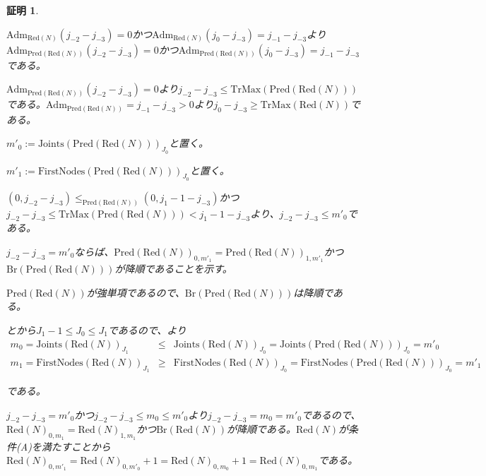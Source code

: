 \documentclass[dvipdfmx,uplatex]{jsarticle}
\theoremstyle{customnonumberbreakfortheorem}
\theoremstyle{customnonumberbreakforproof}
\newtheorem{hideableproof}{証明}
\begin{document}
\begin{hideableproof}
\begin{indented}
\begin{indented}
			\item \(\textrm{Adm}_{\textrm{Red}(N)}(j_{-2}-j_{-3}) = 0\)かつ\(\textrm{Adm}_{\textrm{Red}(N)}(j_0-j_{-3}) = j_{-1}-j_{-3}\)より\(\textrm{Adm}_{\textrm{Pred}(\textrm{Red}(N))}(j_{-2}-j_{-3}) = 0\)かつ\(\textrm{Adm}_{\textrm{Pred}(\textrm{Red}(N))}(j_0-j_{-3}) = j_{-1}-j_{-3}\)である。
			\item \(\textrm{Adm}_{\textrm{Pred}(\textrm{Red}(N))}(j_{-2}-j_{-3}) = 0\)より\(j_{-2}-j_{-3} \leq \textrm{TrMax}(\textrm{Pred}(\textrm{Red}(N)))\)である。\(\textrm{Adm}_{\textrm{Pred}(\textrm{Red}(N))} = j_{-1}-j_{-3} > 0\)より\(j_0-j_{-3} \geq \textrm{TrMax}(\textrm{Red}(N))\)である。
			\item \(m'_0 := \textrm{Joints}(\textrm{Pred}(\textrm{Red}(N)))_{J_0}\)と置く。
			\item \(m'_1 := \textrm{FirstNodes}(\textrm{Pred}(\textrm{Red}(N)))_{J_0}\)と置く。
			\item \((0,j_{-2}-j_{-3}) \leq_{\textrm{Pred}(\textrm{Red}(N))} (0,j_1-1-j_{-3})\)かつ\(j_{-2}-j_{-3} \leq \textrm{TrMax}(\textrm{Pred}(\textrm{Red}(N))) < j_1-1-j_{-3}\)より、\(j_{-2}-j_{-3} \leq m'_0\)である。
			\item
			\item \(j_{-2}-j_{-3} = m'_0\)ならば、\(\textrm{Pred}(\textrm{Red}(N))_{0,m'_1} = \textrm{Pred}(\textrm{Red}(N))_{1,m'_1}\)かつ\(\textrm{Br}(\textrm{Pred}(\textrm{Red}(N)))\)が降順であることを示す。
			\begin{indented}
				\item \(\textrm{Pred}(\textrm{Red}(N))\)が強単項であるので、\(\textrm{Br}(\textrm{Pred}(\textrm{Red}(N)))\)は降順である。
				\item {}とから\(J_1-1 \leq J_0 \leq J_1\)であるので、より
				\begin{eqnarray*}
				m_0 = \textrm{Joints}(\textrm{Red}(N))_{J_1} & \leq & \textrm{Joints}(\textrm{Red}(N))_{J_0} = \textrm{Joints}(\textrm{Pred}(\textrm{Red}(N)))_{J_0} =m'_0 \\
				m_1 = \textrm{FirstNodes}(\textrm{Red}(N))_{J_1} & \geq & \textrm{FirstNodes}(\textrm{Red}(N))_{J_0} = \textrm{FirstNodes}(\textrm{Pred}(\textrm{Red}(N)))_{J_0} =m'_1
				\end{eqnarray*}
				\item である。
				\item \(j_{-2}-j_{-3} = m'_0\)かつ\(j_{-2}-j_{-3} \leq m_0 \leq m'_0\)より\(j_{-2}-j_{-3} = m_0 = m'_0\)であるので、\(\textrm{Red}(N)_{0,m_1} = \textrm{Red}(N)_{1,m_1}\)かつ\(\textrm{Br}(\textrm{Red}(N))\)が降順である。\(\textrm{Red}(N)\)が条件(A)を満たすことから\(\textrm{Red}(N)_{0,m'_1} = \textrm{Red}(N)_{0,m'_0}+1 = \textrm{Red}(N)_{0,m_0}+1 = \textrm{Red}(N)_{0,m_1}\)である。

\end{indented}
\end{indented}
\end{indented}
\end{hideableproof}
\end{document}
